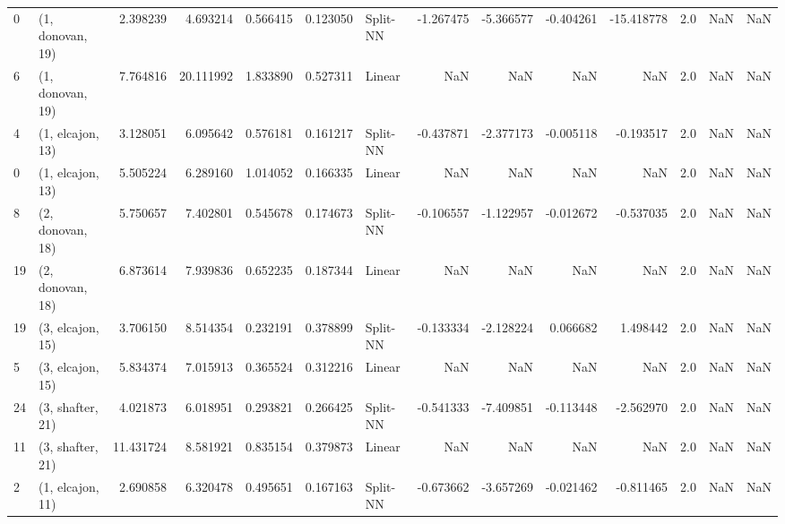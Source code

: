 \begin{tabular}{llrrrrlrrrrrrl}
0  &  (1, donovan, 19) &   2.398239 &   4.693214 &   0.566415 &  0.123050 &    Split-NN &       -1.267475 &     -5.366577 &      -0.404261 &   -15.418778 &            2.0 &    NaN &              NaN \\
6  &  (1, donovan, 19) &   7.764816 &  20.111992 &   1.833890 &  0.527311 &      Linear &             NaN &           NaN &            NaN &          NaN &            2.0 &    NaN &              NaN \\
4  &  (1, elcajon, 13) &   3.128051 &   6.095642 &   0.576181 &  0.161217 &    Split-NN &       -0.437871 &     -2.377173 &      -0.005118 &    -0.193517 &            2.0 &    NaN &              NaN \\
0  &  (1, elcajon, 13) &   5.505224 &   6.289160 &   1.014052 &  0.166335 &      Linear &             NaN &           NaN &            NaN &          NaN &            2.0 &    NaN &              NaN \\
8  &  (2, donovan, 18) &   5.750657 &   7.402801 &   0.545678 &  0.174673 &    Split-NN &       -0.106557 &     -1.122957 &      -0.012672 &    -0.537035 &            2.0 &    NaN &              NaN \\
19 &  (2, donovan, 18) &   6.873614 &   7.939836 &   0.652235 &  0.187344 &      Linear &             NaN &           NaN &            NaN &          NaN &            2.0 &    NaN &              NaN \\
19 &  (3, elcajon, 15) &   3.706150 &   8.514354 &   0.232191 &  0.378899 &    Split-NN &       -0.133334 &     -2.128224 &       0.066682 &     1.498442 &            2.0 &    NaN &              NaN \\
5  &  (3, elcajon, 15) &   5.834374 &   7.015913 &   0.365524 &  0.312216 &      Linear &             NaN &           NaN &            NaN &          NaN &            2.0 &    NaN &              NaN \\
24 &  (3, shafter, 21) &   4.021873 &   6.018951 &   0.293821 &  0.266425 &    Split-NN &       -0.541333 &     -7.409851 &      -0.113448 &    -2.562970 &            2.0 &    NaN &              NaN \\
11 &  (3, shafter, 21) &  11.431724 &   8.581921 &   0.835154 &  0.379873 &      Linear &             NaN &           NaN &            NaN &          NaN &            2.0 &    NaN &              NaN \\
2  &  (1, elcajon, 11) &   2.690858 &   6.320478 &   0.495651 &  0.167163 &    Split-NN &       -0.673662 &     -3.657269 &      -0.021462 &    -0.811465 &            2.0 &    NaN &              NaN \\

\end{tabular}

